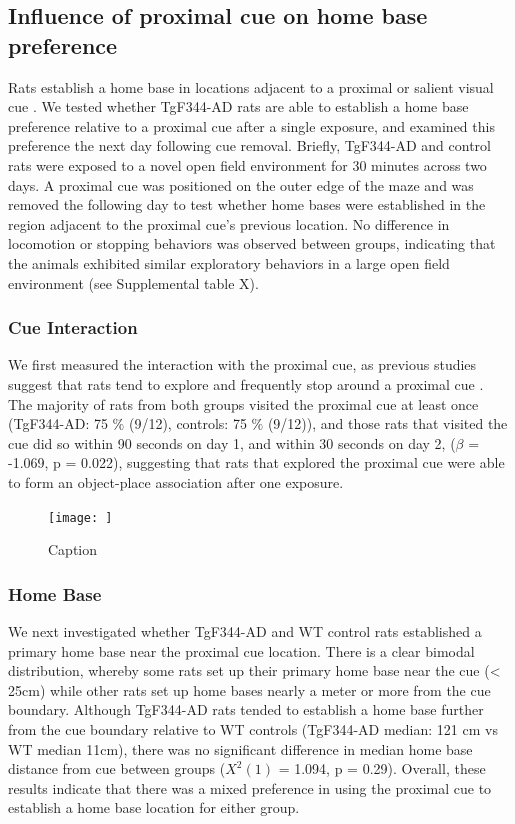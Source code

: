 \documentclass[fleqn,10pt]{wlscirep}
\begin{document}
\subsection*{Influence of proximal cue on home base preference}
Rats establish a home base in locations adjacent to a proximal or salient visual cue \cite{nemati_point_2007,hines_home_2005}. We tested whether TgF344-AD rats are able to establish a home base preference relative to a proximal cue after a single exposure, and examined this preference the next day following cue removal. Briefly, TgF344-AD and control rats were exposed to a novel open field environment for 30 minutes across two days. A proximal cue was positioned on the outer edge of the maze and was removed the following day to test whether home bases were established in the region adjacent to the proximal cue's previous location. No difference in locomotion or stopping behaviors was observed between groups, indicating that the animals exhibited similar exploratory behaviors in a large open field environment (see Supplemental table X).

\subsubsection*{Cue Interaction} 
We first measured the interaction with the proximal cue, as previous studies suggest that rats tend to explore and frequently stop around a proximal cue \cite{hines_home_2005,lehmann_complete_2007}. The majority of rats from both groups visited the proximal cue at least once (TgF344-AD: 75 $\%$ (9/12), controls: 75 $\%$ (9/12)), and those rats that visited the cue did so within 90 seconds on day 1, and within 30 seconds on day 2, ($\beta$ = -1.069, p = 0.022), suggesting that rats that explored the proximal cue were able to form an object-place association after one exposure. 

\begin{figure}
    \centering
    \texttt{[image: ]}
    \caption{Caption}
    \label{homebase_fig}
\end{figure}

\subsubsection*{Home Base} 
We next investigated whether TgF344-AD and WT control rats established a primary home base near the proximal cue location. There is a clear bimodal distribution, whereby some rats set up their primary home base near the cue (< 25cm) while other rats set up home bases nearly a meter or more from the cue boundary. Although TgF344-AD rats tended to establish a home base further from the cue boundary relative to WT controls (TgF344-AD median: 121 cm vs WT median 11cm), there was no significant difference in median home base distance from cue between groups  ($X^2(1)$  = 1.094, p = 0.29). Overall, these results indicate that there was a mixed preference in using the proximal cue to establish a home base location for either group. 
\end{document}
